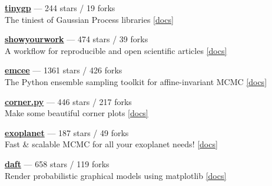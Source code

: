 \item \href{https://github.com/dfm/tinygp}{{\bf tinygp}} --- 244 stars / 19 forks \\
The tiniest of Gaussian Process libraries \href{https://tinygp.readthedocs.io}{[docs]}

\item \href{https://github.com/showyourwork/showyourwork}{{\bf showyourwork}} --- 474 stars / 39 forks \\
A workflow for reproducible and open scientific articles \href{https://show-your.work}{[docs]}

\item \href{https://github.com/dfm/emcee}{{\bf emcee}} --- 1361 stars / 426 forks \\
The Python ensemble sampling toolkit for affine-invariant MCMC \href{https://emcee.readthedocs.io}{[docs]}

\item \href{https://github.com/dfm/corner.py}{{\bf corner.py}} --- 446 stars / 217 forks \\
Make some beautiful corner plots \href{http://corner.readthedocs.io}{[docs]}

\item \href{https://github.com/exoplanet-dev/exoplanet}{{\bf exoplanet}} --- 187 stars / 49 forks \\
Fast {\&} scalable MCMC for all your exoplanet needs!  \href{https://docs.exoplanet.codes}{[docs]}

\item \href{https://github.com/daft-dev/daft}{{\bf daft}} --- 658 stars / 119 forks \\
Render probabilistic graphical models using matplotlib \href{https://docs.daft-pgm.org}{[docs]}